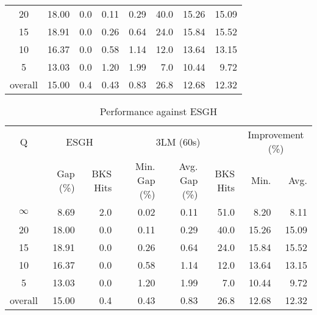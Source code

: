 \begin{table}[H]
\begin{tabular}{c rr rrr rr}
      20 &    18.00 &      0.0 &          0.11 &          0.29 &     40.0 &            15.26 & 15.09 \\
      15 &    18.91 &      0.0 &          0.26 &          0.64 &     24.0 &            15.84 & 15.52 \\
      10 &    16.37 &      0.0 &          0.58 &          1.14 &     12.0 &            13.64 & 13.15 \\
       5 &    13.03 &      0.0 &          1.20 &          1.99 &      7.0 &            10.44 &  9.72 \\
\midrule
 overall &    15.00 &      0.4 &          0.43 &          0.83 &     26.8 &            12.68 & 12.32 \\
\bottomrule
\end{tabular}
\end{table}\begin{table}[H]
\centering
\caption{Performance against ESGH}
\label{tab:3lm_resuts_kritikos1}
\begin{tabular}{c rr rrr rr}
\toprule
       Q & \multicolumn{2}{c}{ESGH} & \multicolumn{3}{c}{3LM (60s)} & \multicolumn{2}{c}{Improvement (\%)} \\
         & Gap (\%) & BKS Hits & Min. Gap (\%) & Avg. Gap (\%) & BKS Hits &             Min. &  Avg. \\
\midrule
$\infty$ &     8.69 &      2.0 &          0.02 &          0.11 &     51.0 &             8.20 &  8.11 \\
      20 &    18.00 &      0.0 &          0.11 &          0.29 &     40.0 &            15.26 & 15.09 \\
      15 &    18.91 &      0.0 &          0.26 &          0.64 &     24.0 &            15.84 & 15.52 \\
      10 &    16.37 &      0.0 &          0.58 &          1.14 &     12.0 &            13.64 & 13.15 \\
       5 &    13.03 &      0.0 &          1.20 &          1.99 &      7.0 &            10.44 &  9.72 \\
\midrule
 overall &    15.00 &      0.4 &          0.43 &          0.83 &     26.8 &            12.68 & 12.32 \\
\bottomrule
\end{tabular}
\end{table}